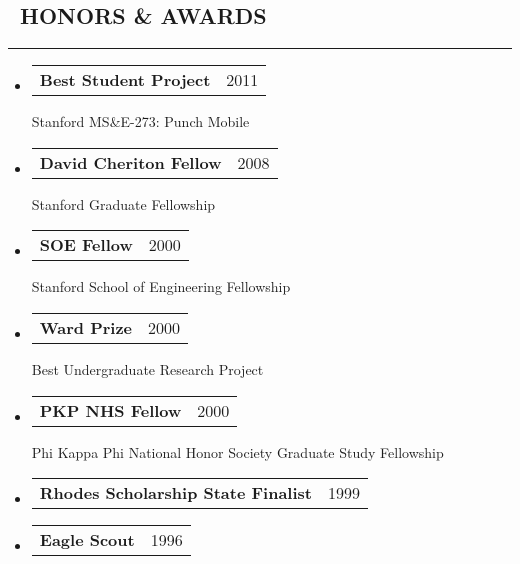 \documentclass[10pt,letterpaper]{article}
\makeatletter
\newenvironment{resumesection}[1]
{%
    \subsection*{\ #1}
    \vspace{-0.4em}
    \hrule
    \vspace{+0.4em}
    \begin{itemize}[leftmargin=0.15cm]
        \parskip=0.1em
}%
{%
    \end{itemize}
}%
\newcommand{\headerrowx}[2]
{\item[] \begin{tabular*}{\linewidth}{l@{\extracolsep{\fill}}r}
	#1 &
	#2 \\
\end{tabular*}}
\makeatother
\begin{document}
\begin{minipage}[t]{.35\textwidth}
\begin{resumesection}{HONORS \& AWARDS}
    Sparse Matrix-Vector Multiply on the {{HICAMP}} Architecture, International Conference on Supercomputing
    
    \headerrowx{\textbf{Best Student Project}}{2011}
    
    Stanford MS\&E-273: Punch Mobile
    
    \headerrowx{\textbf{David Cheriton Fellow}}{2008}
    
    Stanford Graduate Fellowship
    
    \headerrowx{\textbf{SOE Fellow}}{2000}
    
    Stanford School of Engineering Fellowship
    
    \headerrowx{\textbf{Ward Prize}}{2000}
    
    Best Undergraduate Research Project
    
    \headerrowx{\textbf{PKP NHS Fellow}}{2000}
    
    Phi Kappa Phi National Honor Society Graduate Study Fellowship
    
    \headerrowx{\textbf{Rhodes Scholarship State Finalist}} {1999}
    \headerrowx{\textbf{Eagle Scout}}                       {1996}
\end{resumesection}

\end{minipage}
\begin{minipage}[t]{.05\textwidth}
\end{minipage}\hfill
\end{document}
